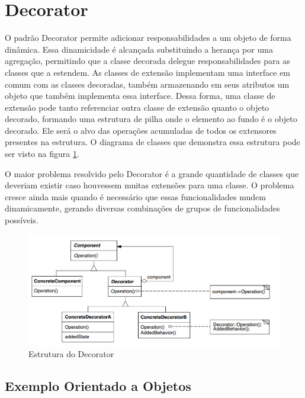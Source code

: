 \section{Decorator}

O padrão Decorator permite adicionar responsabilidades a um 
objeto de forma dinâmica. Essa dinamicidade é alcançada 
substituindo a herança por uma agregação, permitindo que a 
classe decorada delegue responsabilidades para as classes que 
a estendem. As classes de extensão implementam uma 
interface em comum com as classes decoradas, também 
armazenando em seus atributos um objeto que também 
implementa essa interface. Dessa forma, uma classe 
de extensão pode tanto referenciar outra classe de extensão 
quanto o objeto decorado, formando uma estrutura de pilha 
onde o elemento ao fundo é o objeto decorado. Ele será o 
alvo das operações acumuladas de todos os extensores 
presentes na estrutura. O diagrama de classes que 
demonstra essa estrutura pode ser visto na figura 
\ref{decorator_struct}.

O maior problema resolvido pelo Decorator é a grande 
quantidade de classes que deveriam existir caso houvessem 
muitas extensões para uma classe. O problema cresce ainda 
mais quando é necessário que essas funcionalidades mudem 
dinamicamente, gerando diversas combinações de grupos de 
funcionalidades possíveis.

\begin{figure}[htb]
	\caption{\label{decorator_struct}Estrutura do Decorator}
	\begin{center}
	    \includegraphics[scale=0.4]{5_padroes-contexto-funcional/5.2_estruturais/5.2.4_decorator/diagram.png}
	\end{center}
\end{figure}

\subsection*{Exemplo Orientado a Objetos}


